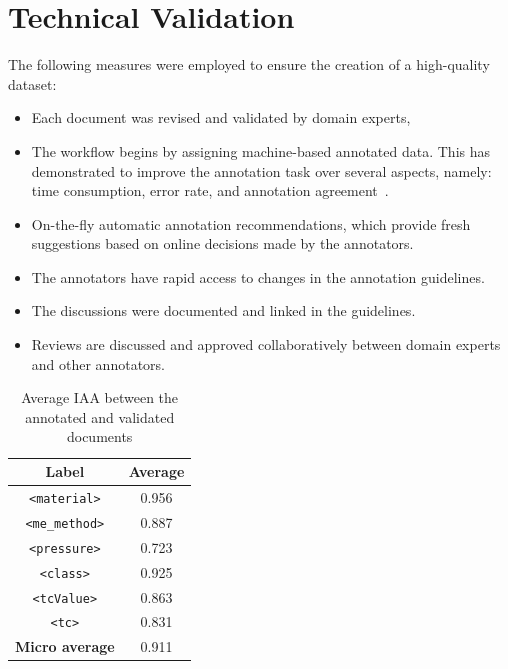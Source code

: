 \section{Technical Validation} 
The following measures were employed to ensure the creation of a high-quality dataset: 
\begin{itemize}
    \item Each document was revised and validated by domain experts, 
    \item The workflow begins by assigning machine-based annotated data. This has demonstrated to improve the annotation task over several aspects, namely: time consumption, error rate, and annotation agreement~\cite{Fort2010InfluenceOP,Nvol2011SemiautomaticSA,Lingren2014EvaluatingTI}.
    \item On-the-fly automatic annotation recommendations, which provide fresh suggestions based on online decisions made by the annotators.
    \item The annotators have rapid access to changes in the annotation guidelines.
    \item The discussions were documented and linked in the guidelines. 
    \item Reviews are discussed and approved collaboratively between domain experts and other annotators.
\end{itemize}

\begin{table}[ht]
    \caption{Average IAA between the annotated and validated documents}
    \begin{tabular}{ cc } 
    \toprule
        \textbf{Label} & \textbf{Average}\\
    \midrule
        \texttt{<material>}     &   0.956   \\
        \texttt{<me\_method>}   &	0.887   \\
        \texttt{<pressure>}     &	0.723   \\
        \texttt{<class>}        &	0.925   \\
        \texttt{<tcValue>}      &	0.863   \\
        \texttt{<tc>}           &	0.831   \\
    \midrule
        \textbf{Micro average}        &	0.911	\\
    \bottomrule
    \end{tabular}
    
    \label{table:average-iaa}
\end{table}

